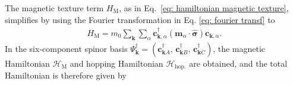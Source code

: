  The magnetic texture term $H_\text{M}$, as in Eq.~\eqref{eq: hamiltonian magnetic texture}, simplifies by using the Fourier transformation in Eq. \eqref{eq: fourier transf} to 
\begin{align}
   H_\text{M} =  m_0\sum_\mathbf{k}\sum_\alpha \mathbf{c}_{\mathbf{k},\alpha}^\dagger(\mathbf{m}_\alpha\cdot  \bm{\hat{\sigma}})\mathbf{c}_{\mathbf{k},\alpha}.
   \label{eq: Hamiltonian magnetic order} 
\end{align}
In the six-component spinor basis $\Psi_\mathbf{k}^\dagger =\left(\mathbf{c}_{\mathbf{k}A}^\dagger,\, \mathbf{c}_{\mathbf{k}B}^\dagger,\, \mathbf{c}_{\mathbf{k}C}^\dagger\right)$, the magnetic Hamiltonian $\mathcal{H}_\text{M}$ and hopping Hamiltonian $\mathcal{H}_\text{hop.}$ are obtained, and the total Hamiltonian is therefore given by

